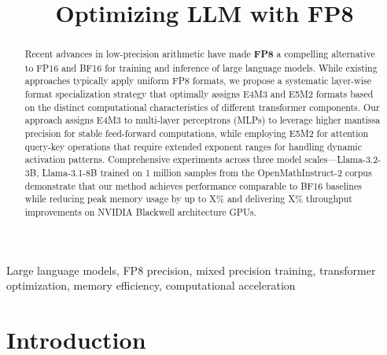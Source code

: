 \documentclass[conference]{IEEEtran}
\begin{document}
\title{Optimizing LLM with FP8}

\author{
\and
{}
}

\maketitle

\begin{abstract}
Recent advances in low-precision arithmetic have made \textbf{FP8} \cite{micikevicius2022fp8formatsdeeplearning} a compelling alternative to FP16 and BF16 for training and inference of large language models. While existing approaches typically apply uniform FP8 formats, we propose a systematic layer-wise format specialization strategy that optimally assigns E4M3 and E5M2 formats based on the distinct computational characteristics of different transformer components. Our approach assigns E4M3 to multi-layer perceptrons (MLPs) to leverage higher mantissa precision for stable feed-forward computations, while employing E5M2 for attention query-key operations that require extended exponent ranges for handling dynamic activation patterns. Comprehensive experiments across three model scales—Llama-3.2-3B, Llama-3.1-8B trained on 1 million samples from the OpenMathInstruct-2 corpus demonstrate that our method achieves performance comparable to BF16 baselines while reducing peak memory usage by up to X\% and delivering X\% throughput improvements on NVIDIA Blackwell architecture GPUs.
\end{abstract}

\begin{IEEEkeywords}
Large language models, FP8 precision, mixed precision training, transformer optimization, memory efficiency, computational acceleration
\end{IEEEkeywords}

\section{Introduction}
\end{document}

